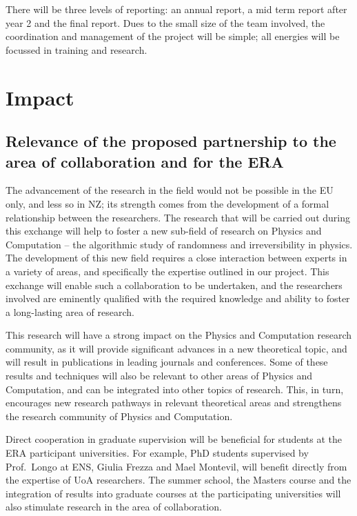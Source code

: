 \documentclass[12pt]{article}
\begin{document}
 There will be three levels of reporting: an annual report, a mid term report after year 2 and the final report. Dues to the small size of the team involved, the coordination and management of the project will be simple; all energies will be focussed in training and research.

\section{Impact}



\subsection{Relevance of the proposed partnership to the area of collaboration and for the ERA}




The advancement of the research in the field would not be possible  in the EU only, and less so in NZ; its strength comes from the development of a formal relationship between the researchers. The research that will be carried out during this exchange will help to foster a new sub-field of research on Physics and Computation -- the algorithmic study of randomness and irreversibility in physics. The development of this new field requires a close interaction between experts in a variety of areas, and specifically the expertise outlined in our project. This exchange will enable such a collaboration to be undertaken, and the researchers involved are eminently qualified with the required knowledge and ability to foster a long-lasting area of research.

This research will have a strong impact on the Physics and Computation research community, as it will provide significant advances in a new theoretical topic, and will result  in publications in leading journals and conferences.
Some of these results and techniques will also be relevant to other areas of Physics and Computation, and can be integrated into other topics of research. This, in turn, encourages new research pathways in relevant theoretical areas and  strengthens the research community of Physics and Computation.



Direct cooperation in graduate supervision will be beneficial for students at the ERA participant universities. For example,  PhD students supervised by Prof.\ Longo at ENS, Giulia Frezza and Mael Montevil, will benefit directly from the  expertise of UoA researchers.  The summer school, the Masters course and the integration of results into graduate courses at the participating universities will also stimulate research in the area of collaboration.
\end{document}
